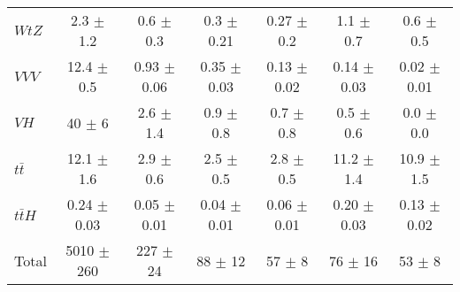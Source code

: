 \begin{tabular}{|l|c|c|c|c|c|c|}
  $WtZ$   & 2.3 $\pm$ 1.2 & 0.6 $\pm$ 0.3 & 0.3 $\pm$ 0.21 & 0.27 $\pm$ 0.2 & 1.1 $\pm$ 0.7 & 0.6 $\pm$ 0.5 \\ 
  $VVV$   & 12.4 $\pm$ 0.5 & 0.93 $\pm$ 0.06 & 0.35 $\pm$ 0.03 & 0.13 $\pm$ 0.02 & 0.14 $\pm$ 0.03 & 0.02 $\pm$ 0.01 \\ 
  $VH$   & 40 $\pm$ 6 & 2.6 $\pm$ 1.4 & 0.9 $\pm$ 0.8 & 0.7 $\pm$ 0.8 & 0.5 $\pm$ 0.6 & 0.0 $\pm$ 0.0 \\ 
  $t\bar{t}$   & 12.1 $\pm$ 1.6 & 2.9 $\pm$ 0.6 & 2.5 $\pm$ 0.5 & 2.8 $\pm$ 0.5 & 11.2 $\pm$ 1.4 & 10.9 $\pm$ 1.5 \\ 
  $t\bar{t}H$   & 0.24 $\pm$ 0.03 & 0.05 $\pm$ 0.01 & 0.04 $\pm$ 0.01 & 0.06 $\pm$ 0.01 & 0.20 $\pm$ 0.03 & 0.13 $\pm$ 0.02 \\ 
\hline 
  Total  & 5010 $\pm$ 260 & 227 $\pm$ 24 & 88 $\pm$ 12 & 57 $\pm$ 8 & 76 $\pm$ 16 & 53 $\pm$ 8 \\ 
\hline 
\end{tabular} 


